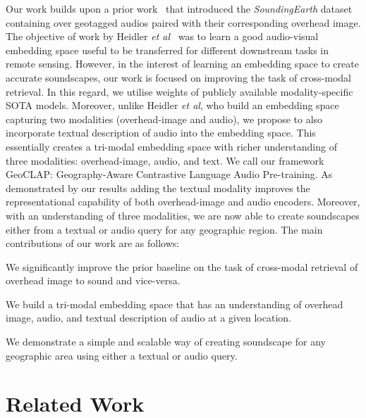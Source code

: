 \documentclass{bmvc2k}
\def\etal{\emph{et al}\bmvaOneDot}
\begin{document}
Our work builds upon a prior work~\cite{heidler2023self} that introduced the {\em SoundingEarth} dataset containing over  geotagged audios paired with their corresponding overhead image. The objective of work by Heidler \etal~\cite{heidler2023self} was to learn a good audio-visual embedding space useful to be transferred for different downstream tasks in remote sensing. However, in the interest of learning an embedding space to create accurate soundscapes, our work is focused on improving the task of cross-modal retrieval. In this regard, we utilise weights of publicly available modality-specific SOTA models. Moreover, unlike Heidler \etal, who build an embedding space capturing two modalities (overhead-image and audio), we propose to also incorporate textual description of audio into the embedding space. This essentially creates a tri-modal embedding space with richer understanding of three modalities: overhead-image, audio, and text. We call our framework GeoCLAP: Geography-Aware Contrastive Language Audio Pre-training. As demonstrated by our results adding the textual modality improves the representational capability of both overhead-image and audio encoders. Moreover, with an understanding of three modalities, we are now able to create soundscapes either from a textual or audio query for any geographic region.  The main contributions of our work are as follows:
\begin{compactitem}
 \item We significantly improve the prior baseline on the task of cross-modal retrieval of overhead image to sound and vice-versa.  
 \item We build a tri-modal embedding space that has an understanding of overhead image, audio, and textual description of audio at a given location.
 \item We demonstrate a simple and scalable way of creating soundscape for any geographic area using either a textual or audio query. 
\end{compactitem}

\section{Related Work}
\label{sec:litreview}
\end{document}
